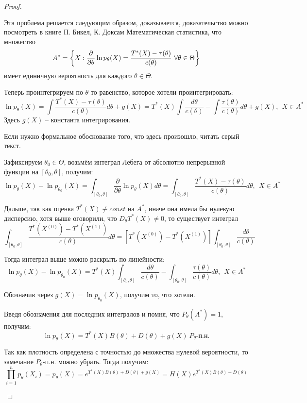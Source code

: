 \begin{proof}
\begin{itemize}
        Эта проблема решается следующим образом, доказывается, доказательство можно посмотреть в книге П. Бикел, К. Доксам Математическая статистика, что множество
        \[
            A^* = \left\{X : \frac{\partial}{\partial \theta} \ln p_\theta(X) = \frac{T^*(X)-\tau(\theta)}{c(\theta)} \ \forall \theta \in \Theta\right\}
        \]
        имеет единичную вероятность для каждого $\theta \in \Theta$.

        Теперь проинтегрируем по $\theta$ то равенство, которое хотели проинтегрировать:
        \[
            \ln p_\theta(X) = \int \frac{T^*(X)-\tau(\theta)}{c(\theta)} d\theta + g(X) = T^*(X) \int \frac{d\theta}{c(\theta)} - \int \frac{\tau(\theta)}{c(\theta)} d\theta + g(X),\ \ X \in A^*
        \]
        Здесь $g(X)$ -- константа интегрирования.

        Если нужно формальное обоснование того, что здесь произошло, читать серый текст.

        \color{gray}
        Зафиксируем $\theta_0 \in \Theta$, возьмём интеграл Лебега от абсолютно непрерывной функции на $[\theta_0, \theta]$, получим:
        \[
            \ln p_\theta(X) - \ln p_{\theta_0}(X) = \int_{[\theta_0, \theta]} \frac{\partial}{\partial \theta} \ln p_\theta(X) d\theta = \int_{[\theta_0, \theta]} \frac{T^*(X)-\tau(\theta)}{c(\theta)} d\theta,\ \ X \in A^*
        \]

        Дальше, так как оценка $T^*(X) \not\equiv const$ на $A^*$, иначе она имела бы нулевую дисперсию, хотя выше оговорили, что $D_\theta T^*(X) \neq 0$, то существует интеграл
        \[
            \int_{[\theta_0, \theta]} \frac{T^*(X^{(0)})-T^*(X^{(1)})}{c(\theta)} d\theta = [T^*(X^{(0)})-T^*(X^{(1)})] \int_{[\theta_0, \theta]} \frac{d\theta}{c(\theta)}
        \]

        Тогда интеграл выше можно раскрыть по линейности:
        \[
            \ln p_\theta(X) - \ln p_{\theta_0}(X) = T^*(X) \int_{[\theta_0, \theta]} \frac{d\theta}{c(\theta)} - \int_{[\theta_0, \theta]} \frac{\tau(\theta)}{c(\theta)} d\theta,\ \ X \in A^*
        \]

        Обозначив через $g(X) = \ln p_{\theta_0}(X)$, получим то, что хотели.

        \color{black}
        Введя обозначения для последних интегралов и помня, что $P_\theta(A^*) = 1$, получим:
        \[
            \ln p_\theta(X) = T^*(X) B(\theta) + D(\theta) + g(X) \ P_\theta \text{-п.н.}
        \]

        Так как плотность определена с точностью до множества нулевой вероятности, то замечание $P_\theta \text{-п.н.}$ можно убрать. Тогда получим:
        \[
            \prod_{i=1}^n p_\theta(X_i) = p_\theta(X) = e^{T^*(X) B(\theta) + D(\theta) + g(X)} = H(X) e^{T^*(X) B(\theta) + D(\theta)}
        \]


\end{itemize}
\end{proof}
